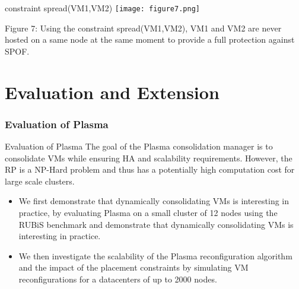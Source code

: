 \begin{frame}{constraint spread({VM1,VM2})}
\texttt{[image: figure7.png]} 

Figure 7: Using the constraint spread({VM1,VM2}), VM1 and VM2 are never
hosted on a same node at the same moment to provide a full protection against
SPOF.
\end{frame}

\part{Evaluation and Extension} 
\section{Evaluation of Plasma} 
\begin{frame}{Evaluation of Plasma}
The goal of the Plasma consolidation manager is to \alert{consolidate VMs while ensuring
HA and scalability requirements}. However, the RP is a NP-Hard problem
and thus has a \alert{potentially high computation cost} for large scale clusters. 
 \pause{}
\begin{itemize}
\item We first demonstrate that dynamically consolidating VMs is interesting in practice, by
evaluating Plasma on a small cluster of 12 nodes using the RUBiS benchmark 
and demonstrate that dynamically consolidating VMs is interesting in practice.
 \pause{}
\item We then investigate the scalability of the Plasma reconfiguration algorithm and
the impact of the placement constraints by simulating VM reconfigurations for
a datacenters of up to 2000 nodes.
\end{itemize}
\end{frame}

